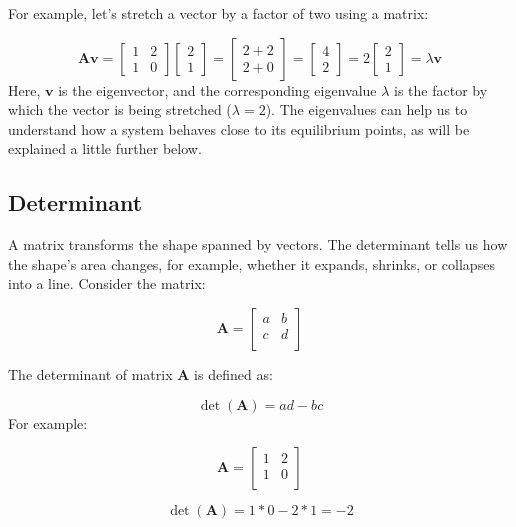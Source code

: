 \documentclass[
]{article}
\begin{document}
For example, let's stretch a vector by a factor of two using a matrix:

\[
\mathbf{Av} =
\begin{bmatrix}
1 & 2 \\
1 & 0
\end{bmatrix}
\begin{bmatrix}
2 \\
1
\end{bmatrix}
=
\begin{bmatrix}
2 + 2 \\
2 + 0
\end{bmatrix}
=
\begin{bmatrix}
4 \\
2
\end{bmatrix}
= 2 \begin{bmatrix}
2 \\
1
\end{bmatrix}
= \lambda \mathbf{v}
\] Here, \(\mathbf{v}\) is the eigenvector, and the corresponding
eigenvalue \(\lambda\) is the factor by which the vector is being
stretched (\(\lambda = 2\)). The eigenvalues can help us to understand
how a system behaves close to its equilibrium points, as will be
explained a little further below.

\hypertarget{determinant}{%
\subsection{Determinant}\label{determinant}}

A matrix transforms the shape spanned by vectors. The determinant tells
us how the shape's area changes, for example, whether it expands,
shrinks, or collapses into a line. Consider the matrix:

\[
\mathbf{A} =
\begin{bmatrix}
a & b \\
c & d \\
\end{bmatrix}
\]

The determinant of matrix \(\mathbf{A}\) is defined as:

\[
\det(\mathbf{A}) = ad -bc
\] For example:

\[
\mathbf{A} =
\begin{bmatrix}
1 & 2 \\
1 & 0 \\
\end{bmatrix}
\]

\[
\det(\mathbf{A}) = 1*0 - 2*1 = -2
\]
\end{document}
